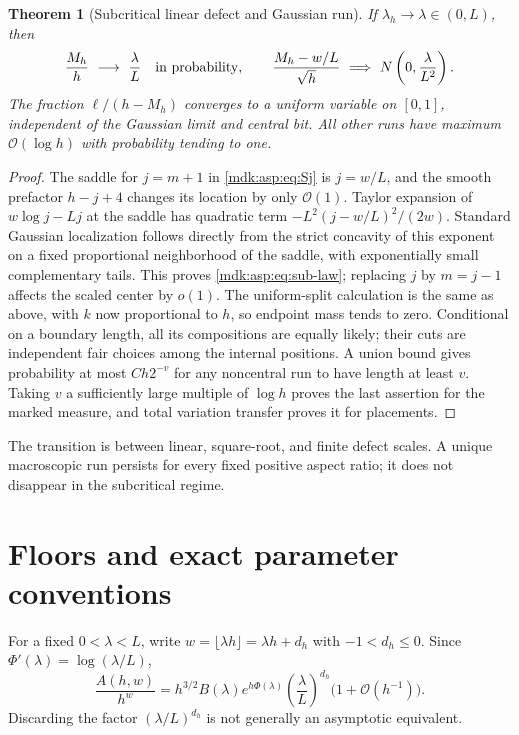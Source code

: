 \documentclass[11pt,letterpaper]{article}
\numberwithin{equation}{section}
\newtheorem{theorem}{Theorem}[section]
\theoremstyle{remark}\newtheorem{remark}[theorem]{Remark}
\newcommand{\Oh}{\mathcal O}\newcommand{\Q}{\mathbb Q}\newcommand{\N}{\mathbb N}\newcommand{\R}{\mathbb R}
\begin{document}
\begin{theorem}[Subcritical linear defect and Gaussian run]\label{mdk:asp:thm:law-sub}
If $\lambda_h\to\lambda\in(0,L)$, then
\begin{equation}\label{mdk:asp:eq:sub-law}
\frac{M_h}{h}\ \longrightarrow\ \frac\lambda L\quad\hbox{in probability},\qquad
\frac{M_h-w/L}{\sqrt h}\ \Longrightarrow\ N\left(0,\frac\lambda{L^2}\right).
\end{equation}
The fraction $\ell/(h-M_h)$ converges to a uniform variable on $[0,1]$, independent of the Gaussian limit and central bit. All other runs have maximum $\Oh(\log h)$ with probability tending to one.
\end{theorem}
\begin{proof}
The saddle for $j=m+1$ in \eqref{mdk:asp:eq:Sj} is $j=w/L$, and the smooth prefactor $h-j+4$ changes its location by only $\Oh(1)$. Taylor expansion of $w\log j-Lj$ at the saddle has quadratic term $-L^2(j-w/L)^2/(2w)$. Standard Gaussian localization follows directly from the strict concavity of this exponent on a fixed proportional neighborhood of the saddle, with exponentially small complementary tails. This proves \eqref{mdk:asp:eq:sub-law}; replacing $j$ by $m=j-1$ affects the scaled center by $o(1)$. The uniform-split calculation is the same as above, with $k$ now proportional to $h$, so endpoint mass tends to zero. Conditional on a boundary length, all its compositions are equally likely; their cuts are independent fair choices among the internal positions. A union bound gives probability at most $Ch2^{-v}$ for any noncentral run to have length at least $v$. Taking $v$ a sufficiently large multiple of $\log h$ proves the last assertion for the marked measure, and total variation transfer proves it for placements.
\end{proof}
The transition is between linear, square-root, and finite defect scales. A unique macroscopic run persists for every fixed positive aspect ratio; it does not disappear in the subcritical regime.

\section{Floors and exact parameter conventions}\label{mdk:asp:sec:floors}
For a fixed $0<\lambda<L$, write $w=\lfloor\lambda h\rfloor=\lambda h+d_h$ with $-1<d_h\le0$. Since $\Phi'(\lambda)=\log(\lambda/L)$,
\begin{equation}\label{mdk:asp:eq:subfloor}
\frac{A(h,w)}{h^w}=h^{3/2}B(\lambda)e^{h\Phi(\lambda)}
\left(\frac\lambda L\right)^{d_h}\bigl(1+\Oh(h^{-1})\bigr).
\end{equation}
Discarding the factor $(\lambda/L)^{d_h}$ is not generally an asymptotic equivalent.
\end{document}
